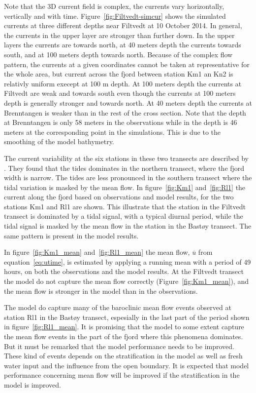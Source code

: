 Note that the 3D current field is complex, the currents vary horizontally, vertically and with time. Figure~\ref{fig:Filtvedt-simcur} shows the simulated currents at three different depths near Filtvedt at 10 October 2014. In general, the currents in the upper layer are stronger than further down. In the upper layers the currents are towards north, at 40 meters depth the currents towards south, and at 100 meters depth towards north. Because of the complex flow pattern, the currents at a given coordinates cannot be taken at representative for the whole area, but current across the fjord between station Km1 an Kn2 is relativly uniform execept at 100 m depth. At 100 meters depth the currents at Filtvedt are weak and towards south even though the currents at 100 meters depth is generally stronger and towards north. At 40 meters depth the currents at Brenntangen is weaker than in the rest of the cross section. Note that the depth at Brenntangen is only 58 meters in the observations while in the depth is 46 meters at the corresponding point in the simulations. This is due to the smoothing of the model bathymetry. 

\clearpage 

The current variability at the six stations in these two transects are described by \cite{staalstrom:2015}. They found that the tides dominates in the northern transect, where the fjord width is narrow. The tides are less pronounced in the southern transect where the tidal variation is masked by the mean flow. In figure~\ref{fig:Km1} and~\ref{fig:Rl1} the current along the fjord based on observations and model results, for the two stations Km1 and Rl1 are shown. This illustrate that the station in the Filtvedt transect is dominated by a tidal signal, with a typical diurnal period, while the tidal signal is masked by the mean flow in the station in the Bast{\o}y transect. The same pattern is present in the model results.

In figure~\ref{fig:Km1_mean} and~\ref{fig:Rl1_mean} the mean flow, $\overline{u}$ from equation~\ref{eq:utime}, is estimated by applying a running mean with a period of 49 hours, on both the observations and the model results. At the Filtvedt transect the model do not capture the mean flow correctly (Figure~\ref{fig:Km1_mean}), and the mean flow is stronger in the model than in the observations.

The model do capture many of the baroclinic mean flow events observed at station Rl1 in the Bast{\o}y transect, espesially in the last part of the period shown in figure~\ref{fig:Rl1_mean}. It is promising that the model to some extent capture the mean flow events in the part of the fjord where this phenomena dominates. But it must be remarked that the model performance needs to be improved. These kind of events depends on the stratification in the model as well as fresh water input and the influence from the open boundary. It is expected that model performance concerning mean flow will be improved if the stratification in the model is improved. 
  
